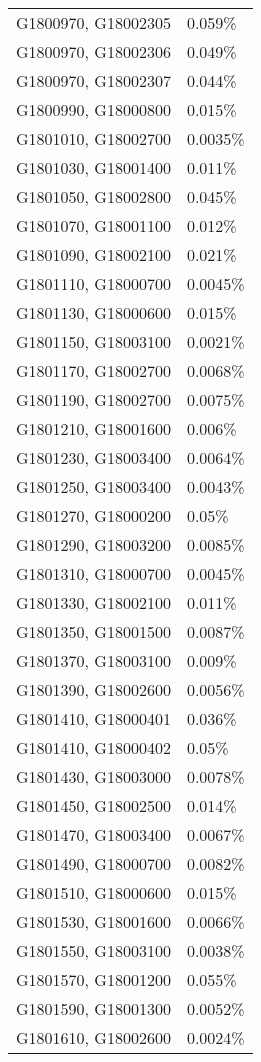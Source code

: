 \begin{longtable}[]{@{}ll@{}}
G1800970, G18002305 & 0.059\% \\
G1800970, G18002306 & 0.049\% \\
G1800970, G18002307 & 0.044\% \\
G1800990, G18000800 & 0.015\% \\
G1801010, G18002700 & 0.0035\% \\
G1801030, G18001400 & 0.011\% \\
G1801050, G18002800 & 0.045\% \\
G1801070, G18001100 & 0.012\% \\
G1801090, G18002100 & 0.021\% \\
G1801110, G18000700 & 0.0045\% \\
G1801130, G18000600 & 0.015\% \\
G1801150, G18003100 & 0.0021\% \\
G1801170, G18002700 & 0.0068\% \\
G1801190, G18002700 & 0.0075\% \\
G1801210, G18001600 & 0.006\% \\
G1801230, G18003400 & 0.0064\% \\
G1801250, G18003400 & 0.0043\% \\
G1801270, G18000200 & 0.05\% \\
G1801290, G18003200 & 0.0085\% \\
G1801310, G18000700 & 0.0045\% \\
G1801330, G18002100 & 0.011\% \\
G1801350, G18001500 & 0.0087\% \\
G1801370, G18003100 & 0.009\% \\
G1801390, G18002600 & 0.0056\% \\
G1801410, G18000401 & 0.036\% \\
G1801410, G18000402 & 0.05\% \\
G1801430, G18003000 & 0.0078\% \\
G1801450, G18002500 & 0.014\% \\
G1801470, G18003400 & 0.0067\% \\
G1801490, G18000700 & 0.0082\% \\
G1801510, G18000600 & 0.015\% \\
G1801530, G18001600 & 0.0066\% \\
G1801550, G18003100 & 0.0038\% \\
G1801570, G18001200 & 0.055\% \\
G1801590, G18001300 & 0.0052\% \\
G1801610, G18002600 & 0.0024\% \\

\end{longtable}
